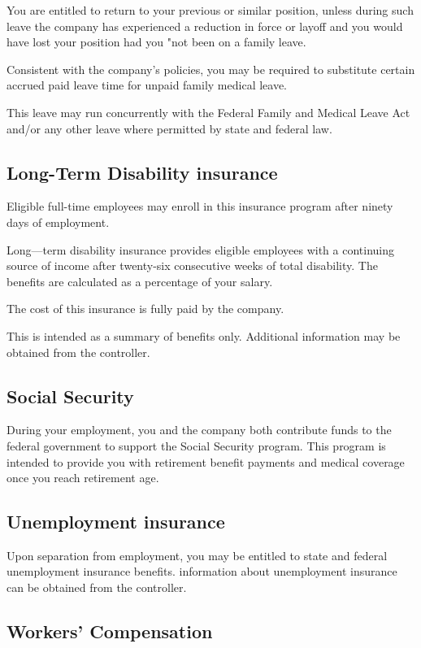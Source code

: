 You are entitled to return to your previous or similar position, unless during such leave the company has experienced a reduction in force or layoff and you would have lost your position had you "not been on a family leave.

Consistent with the company's policies, you may be required to substitute certain accrued paid leave time for unpaid family medical leave.

This leave may run concurrently with the Federal Family and Medical Leave Act and/or any other leave where permitted by state and federal law.

\subsection{Long-Term Disability insurance}

Eligible full-time employees may enroll in this insurance program after ninety days of employment.

Long—term disability insurance provides eligible employees with a continuing source of income after twenty-six consecutive weeks of total disability. The benefits are calculated as a percentage of your salary.

The cost of this insurance is fully paid by the company.

This is intended as a summary of benefits only. Additional information may be obtained from the controller.

\subsection{Social Security}

During your employment, you and the company both contribute funds to the federal government to support the Social Security program. This program is intended to provide you with retirement benefit payments and medical coverage once you reach retirement age.

\subsection{Unemployment insurance}

Upon separation from employment, you may be entitled to state and federal unemployment insurance benefits. information about unemployment insurance can be obtained from the controller.

\subsection{Workers' Compensation}

